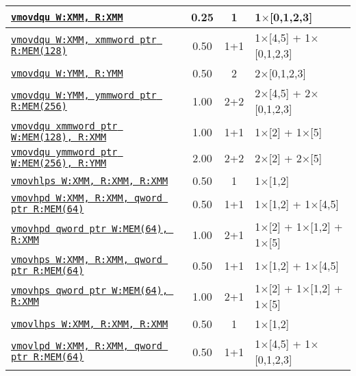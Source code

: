 \documentclass[a4paper,english,fontsize=9]{scrartcl}
\begin{document}
\begin{longtable}{p{}ccL{.25\textwidth}}
  \midrule
  \texttt{\href{https://felixcloutier.com/x86/MOVDQU:VMOVDQU8:VMOVDQU16:VMOVDQU32:VMOVDQU64.html}{vmovdqu W:XMM, R:XMM}} & 0.25 & 1 & 1\(\times\)[0,1,2,3] \\
  \midrule
  \texttt{\href{https://felixcloutier.com/x86/MOVDQU:VMOVDQU8:VMOVDQU16:VMOVDQU32:VMOVDQU64.html}{vmovdqu W:XMM, xmmword ptr R:MEM(128)}} & 0.50 & 1+1 & 1\(\times\)[4,5] + 1\(\times\)[0,1,2,3] \\
  \midrule
  \texttt{\href{https://felixcloutier.com/x86/MOVDQU:VMOVDQU8:VMOVDQU16:VMOVDQU32:VMOVDQU64.html}{vmovdqu W:YMM, R:YMM}} & 0.50 & 2 & 2\(\times\)[0,1,2,3] \\
  \midrule
  \texttt{\href{https://felixcloutier.com/x86/MOVDQU:VMOVDQU8:VMOVDQU16:VMOVDQU32:VMOVDQU64.html}{vmovdqu W:YMM, ymmword ptr R:MEM(256)}} & 1.00 & 2+2 & 2\(\times\)[4,5] + 2\(\times\)[0,1,2,3] \\
  \midrule
  \texttt{\href{https://felixcloutier.com/x86/MOVDQU:VMOVDQU8:VMOVDQU16:VMOVDQU32:VMOVDQU64.html}{vmovdqu xmmword ptr W:MEM(128), R:XMM}} & 1.00 & 1+1 & 1\(\times\)[2] + 1\(\times\)[5] \\
  \midrule
  \texttt{\href{https://felixcloutier.com/x86/MOVDQU:VMOVDQU8:VMOVDQU16:VMOVDQU32:VMOVDQU64.html}{vmovdqu ymmword ptr W:MEM(256), R:YMM}} & 2.00 & 2+2 & 2\(\times\)[2] + 2\(\times\)[5] \\
  \midrule
  \texttt{\href{https://felixcloutier.com/x86/MOVHLPS.html}{vmovhlps W:XMM, R:XMM, R:XMM}} & 0.50 & 1 & 1\(\times\)[1,2] \\
  \midrule
  \texttt{\href{https://felixcloutier.com/x86/MOVHPD.html}{vmovhpd W:XMM, R:XMM, qword ptr R:MEM(64)}} & 0.50 & 1+1 & 1\(\times\)[1,2] + 1\(\times\)[4,5] \\
  \midrule
  \texttt{\href{https://felixcloutier.com/x86/MOVHPD.html}{vmovhpd qword ptr W:MEM(64), R:XMM}} & 1.00 & 2+1 & 1\(\times\)[2] + 1\(\times\)[1,2] + 1\(\times\)[5] \\
  \midrule
  \texttt{\href{https://felixcloutier.com/x86/MOVHPS.html}{vmovhps W:XMM, R:XMM, qword ptr R:MEM(64)}} & 0.50 & 1+1 & 1\(\times\)[1,2] + 1\(\times\)[4,5] \\
  \midrule
  \texttt{\href{https://felixcloutier.com/x86/MOVHPS.html}{vmovhps qword ptr W:MEM(64), R:XMM}} & 1.00 & 2+1 & 1\(\times\)[2] + 1\(\times\)[1,2] + 1\(\times\)[5] \\
  \midrule
  \texttt{\href{https://felixcloutier.com/x86/MOVLHPS.html}{vmovlhps W:XMM, R:XMM, R:XMM}} & 0.50 & 1 & 1\(\times\)[1,2] \\
  \midrule
  \texttt{\href{https://felixcloutier.com/x86/MOVLPD.html}{vmovlpd W:XMM, R:XMM, qword ptr R:MEM(64)}} & 0.50 & 1+1 & 1\(\times\)[4,5] + 1\(\times\)[0,1,2,3] \\

\end{longtable}
\end{document}
